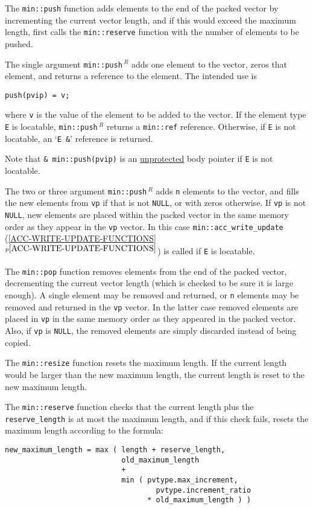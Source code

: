 \documentclass[12pt]{article}
\newcommand{\itemref}[1]{\ref{#1}$^{p\pageref{#1}}$}
\newcommand{\EOL}{\penalty \exhyphenpenalty}
\newenvironment{indpar}[1][0.3in]%
	{\begin{list}{}%
		     {\setlength{\itemsep}{0in}%
		      \setlength{\topsep}{0in}%
		      \setlength{\parsep}{1ex}%
		      \setlength{\labelwidth}{#1}%
		      \setlength{\leftmargin}{#1}%
		      \addtolength{\leftmargin}{\labelsep}}%
	 \item}%
	{\end{list}}
\newcommand{\REL}{$\,^R$}
\begin{document}
The \verb|min::push| function adds elements
to the end of the packed vector
by incrementing the current vector length, and if this would
exceed the maximum length, first calls the \verb|min::reserve| function
with the number of elements to be pushed.

The single argument {\tt min::\EOL push\REL} adds one element to the vector,
zeros that element, and returns a reference to the element.  The
intended use is
\begin{indpar}\begin{verbatim}
push(pvip) = v;
\end{verbatim}\end{indpar}
where \verb|v| is the value of the element to be added to the vector.
If the element type {\tt E} is locatable, {\tt min::\EOL push\REL}
returns a {\tt min::\EOL ref\TARG}
reference.  Otherwise, if {\tt E} is not locatable, an
`{\tt E \&}' reference is returned.

Note that {\tt \& min::push(pvip)}
is an \underline{unprotected} body pointer if {\tt E} is not
locatable.

The two or three argument {\tt min::\EOL push\REL} adds {\tt n}
elements to the vector, and fills the new elements from {\tt vp}
if that is not {\tt NULL}, or with zeros otherwise.
If \verb|vp| is not \verb|NULL|,
new elements are placed within the packed vector in the same
memory order as they appear in the \verb|vp| vector.
In this case
{\tt min::\EOL acc\_\EOL write\_\EOL update} 
(\itemref{ACC-WRITE-UPDATE-FUNCTIONS})
is called if {\tt E} is locatable.

The \verb|min::pop| function removes elements from the end of the
packed vector, decrementing the current vector length (which is checked
to be sure it is large enough).   A single element may be removed and
returned, or \verb|n| elements may be removed and returned in the
\verb|vp| vector.  In the latter case removed elements are placed in
\verb|vp| in the same memory order as they appeared in the packed vector.
Also,
if \verb|vp| is \verb|NULL|, the removed elements are simply discarded
instead of being copied.

The \verb|min::resize| function resets the maximum length.  If
the current length would be larger than the new maximum length,
the current length is reset to the new maximum length.

The \verb|min::reserve| function checks that
the current length plus the \verb|reserve_length| is
at most the maximum length, and if this check fails,
resets the maximum length according to the formula:
\begin{indpar}\begin{verbatim}
new_maximum_length = max ( length + reserve_length,
                           old_maximum_length
                           +
                           min ( pvtype.max_increment,
                                   pvtype.increment_ratio
                                 * old_maximum_length ) )
\end{verbatim}\end{indpar}\label{PACKED-VEC-EXPANSION-FORMULA}
\end{document}

